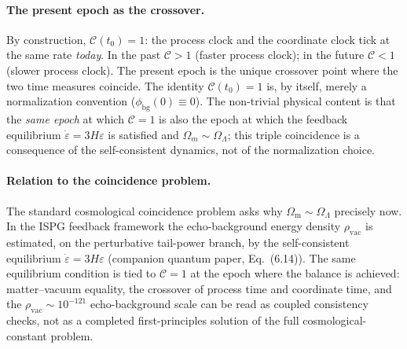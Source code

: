 \documentclass[11pt]{article}
\begin{document}
\paragraph{The present epoch as the crossover.}
By construction, $\mathcal{C}(t_0)=1$: the process clock and the
coordinate clock tick at the same rate \emph{today}.  In the past
$\mathcal{C}>1$ (faster process clock); in the future $\mathcal{C}<1$
(slower process clock).  The present epoch is the unique crossover point
where the two time measures coincide.  The identity
$\mathcal{C}(t_0)=1$ is, by itself, merely a normalization
convention ($\phi_{\mathrm{bg}}(0)\equiv 0$).  The
non-trivial physical content is that the \emph{same epoch}
at which $\mathcal{C}=1$ is also the epoch at which the
feedback equilibrium $\dot\varepsilon=3H\varepsilon$ is
satisfied and $\Omega_m\sim\Omega_\Lambda$; this triple
coincidence is a consequence of the self-consistent dynamics,
not of the normalization choice.

\paragraph{Relation to the coincidence problem.}
The standard cosmological coincidence problem asks why
$\Omega_{\mathrm{m}}\sim\Omega_{\Lambda}$ precisely now.  In the
ISPG feedback framework the echo-background energy density
$\rho_{\mathrm{vac}}$ is estimated, on the perturbative tail-power
branch, by the self-consistent equilibrium
$\dot\varepsilon = 3H\varepsilon$ (companion quantum paper,
Eq.~(6.14)).  The same equilibrium condition is tied to
$\mathcal{C}=1$ at the epoch where the balance is achieved:
matter--vacuum equality, the crossover of process time and coordinate
time, and the $\rho_{\mathrm{vac}}\sim 10^{-121}$
echo-background scale can be read as coupled consistency checks, not
as a completed first-principles solution of the full
cosmological-constant problem.
\end{document}
